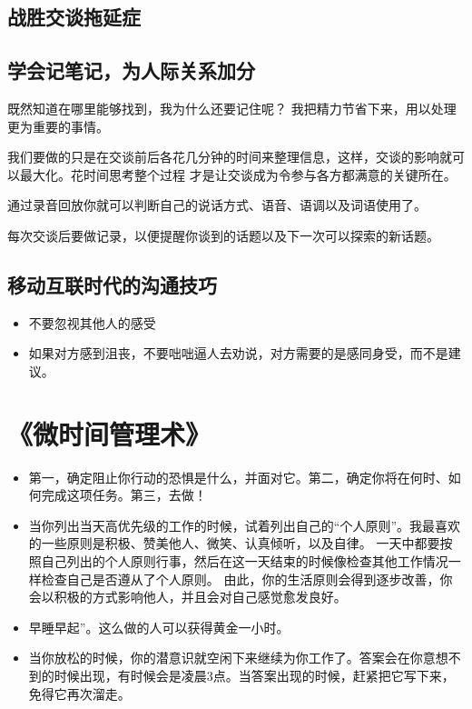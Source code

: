 \documentclass[UTF8,a4paper,8pt]{ctexart}
\begin{document}
	 \subsection{战胜交谈拖延症}
	 
	 \subsection{学会记笔记，为人际关系加分}
		 既然知道在哪里能够找到，我为什么还要记住呢？ 我把精力节省下来，用以处理更为重要的事情。
		 
		 我们要做的只是在交谈前后各花几分钟的时间来整理信息，这样，交谈的影响就可以最大化。花时间思考整个过程 才是让交谈成为令参与各方都满意的关键所在。
		 
		 通过录音回放你就可以判断自己的说话方式、语音、语调以及词语使用了。
		 
		 每次交谈后要做记录，以便提醒你谈到的话题以及下一次可以探索的新话题。
	 \subsection{移动互联时代的沟通技巧}
	 
	 \begin{itemize}
	 	\item 不要忽视其他人的感受
	 	\item 如果对方感到沮丧，不要咄咄逼人去劝说，对方需要的是感同身受，而不是建议。
	 \end{itemize}
	 
	 
 \newpage
 \section{《微时间管理术》 }
 \begin{itemize}
 	\item 
 	第一，确定阻止你行动的恐惧是什么，并面对它。第二，确定你将在何时、如何完成这项任务。第三，去做！
 	\item 当你列出当天高优先级的工作的时候，试着列出自己的“个人原则”。我最喜欢的一些原则是积极、赞美他人、微笑、认真倾听，以及自律。 一天中都要按照自己列出的个人原则行事，然后在这一天结束的时候像检查其他工作情况一样检查自己是否遵从了个人原则。 由此，你的生活原则会得到逐步改善，你会以积极的方式影响他人，并且会对自己感觉愈发良好。
 	\item 早睡早起”。这么做的人可以获得黄金一小时。
 	\item 当你放松的时候，你的潜意识就空闲下来继续为你工作了。答案会在你意想不到的时候出现，有时候会是凌晨3点。当答案出现的时候，赶紧把它写下来，免得它再次溜走。	
 \end{itemize}
 
\end{document}
